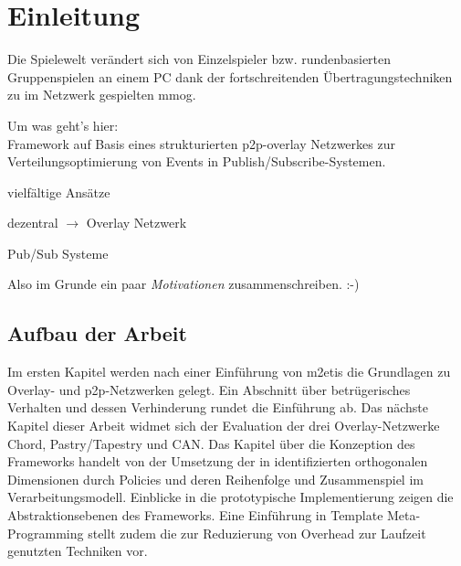 \chapter{Einleitung}
\label{chap:einleitung}

Die Spielewelt verändert sich von Einzelspieler bzw. rundenbasierten Gruppenspielen an einem PC dank der fortschreitenden Übertragungstechniken zu im Netzwerk gespielten \ac{mmog}.

Um was geht's hier:\\
Framework auf Basis eines strukturierten p2p-overlay Netzwerkes zur Verteilungsoptimierung von Events in Publish/Subscribe-Systemen.

\begin{itemize*}
\item vielfältige Ansätze \cite{Bharambe2008Donnybrook} %
\item dezentral $\rightarrow$ Overlay Netzwerk
\item Pub/Sub Systeme \cite{Knutsson2004Peertopeer, Triebel2008Peertopeer} %
\end{itemize*}

Also im Grunde ein paar \emph{Motivationen} zusammenschreiben. :-)

\cite{Fischer2010Event, Fischer2010a} %

\section{Aufbau der Arbeit}
Im ersten Kapitel werden nach einer Einführung von \ac{m2etis} die Grundlagen zu Overlay- und p2p-Netzwerken gelegt. Ein Abschnitt über betrügerisches Verhalten und dessen Verhinderung rundet die Einführung ab. Das nächste Kapitel dieser Arbeit widmet sich der Evaluation der drei Overlay-Netzwerke Chord, Pastry/Tapestry und CAN. Das Kapitel über die Konzeption des Frameworks handelt von der Umsetzung der in \cite{Fischer2010Event} identifizierten orthogonalen Dimensionen durch Policies und deren Reihenfolge und Zusammenspiel im Verarbeitungsmodell. Einblicke in die prototypische Implementierung zeigen die Abstraktionsebenen des Frameworks. Eine Einführung in Template Meta-Programming stellt zudem die zur Reduzierung von Overhead zur Laufzeit genutzten Techniken vor.
